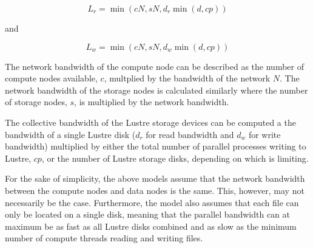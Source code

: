     \begin{equation} %
        L_{r} = \min{(cN, sN, d_{r}\min{(d, cp)})}
    \end{equation}

    and


    \begin{equation}%
        L_{w} = \min{(cN, sN, d_{w}\min{(d, cp)})}
    \end{equation}

    The network bandwidth of the compute node can be described as the number of compute 
    nodes available, $c$, multplied by the bandwidth of the network $N$. The network bandwidth 
    of the storage nodes is calculated similarly where the number of storage nodes, $s$, is
    multiplied by the network bandwidth. 

    The collective bandwidth of the Lustre storage devices can be computed a the bandwidth of a
    single Lustre disk ($d_{r}$ for read bandwidth and $d_{w}$ for write bandwidth) multiplied by 
    either the total number of parallel processes writing to Lustre, $cp$, or the number of Lustre 
    storage disks, depending on which is limiting.



      For the sake of simplicity, the above models assume that the network
      bandwidth between the compute nodes and data nodes is the same. This,
      however, may not necessarily be the case. Furthermore, the model also
      assumes that each file can only be located on a single disk, meaning that
      the parallel bandwidth can at maximum be as fast as all Lustre disks combined and
      as slow as the minimum number of compute threads reading and writing
      files.

